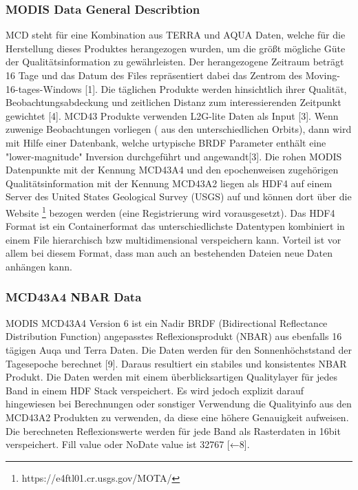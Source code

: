 \documentclass[11pt]{report}
\begin{document}
\subsubsection{MODIS Data General Describtion}
MCD steht für eine Kombination aus TERRA und AQUA Daten, welche für die Herstellung dieses Produktes herangezogen wurden, um die größt mögliche Güte der Qualitätsinformation zu gewährleisten. Der herangezogene Zeitraum beträgt 16 Tage und das Datum des Files repräsentiert dabei das Zentrom des Moving-16-tages-Windows [1]. Die täglichen Produkte werden hinsichtlich ihrer Qualität, Beobachtungsabdeckung und zeitlichen Distanz zum interessierenden Zeitpunkt gewichtet [4]. MCD43 Produkte verwenden L2G-lite Daten als Input [3]. Wenn zuwenige Beobachtungen vorliegen ( aus den unterschiedlichen Orbits), dann wird mit Hilfe einer Datenbank, welche urtypische BRDF Parameter enthält eine "lower-magnitude" Inversion durchgeführt und angewandt[3].
Die rohen MODIS Datenpunkte mit der Kennung MCD43A4  und den epochenweisen zugehörigen Qualitätsinformation mit der Kennung MCD43A2 liegen als HDF4 auf einem Server des United States Geological Survey (USGS) auf und können dort über die Website \footnote{https://e4ftl01.cr.usgs.gov/MOTA/} bezogen werden (eine Registrierung wird vorausgesetzt). Das HDF4 Format ist ein Containerformat das unterschiedlichste Datentypen kombiniert in einem File hierarchisch bzw multidimensional verspeichern kann. Vorteil ist vor allem bei diesem Format, dass man auch an bestehenden Dateien neue Daten anhängen kann.

\subsubsection{MCD43A4 NBAR Data} \label{NBAR}
MODIS MCD43A4 Version 6 ist ein Nadir BRDF (Bidirectional Reflectance Distribution Function) angepasstes Reflexionsprodukt (NBAR) aus ebenfalls 16 tägigen Auqa und Terra Daten. Die Daten werden für den Sonnenhöchststand der Tagesepoche berechnet [9]. Daraus resultiert ein stabiles und konsistentes NBAR Produkt. Die Daten werden mit einem überblicksartigen Qualitylayer für jedes Band in einem HDF Stack verspeichert. Es wird jedoch explizit darauf hingewiesen bei Berechnungen oder sonstiger Verwendung die Qualityinfo aus den MCD43A2 Produkten zu verwenden, da diese eine höhere Genauigkeit aufweisen. Die berechneten Reflexionswerte werden für jede Band als Rasterdaten in 16bit verspeichert. Fill value oder NoDate value ist 32767 [←8].
\end{document}
